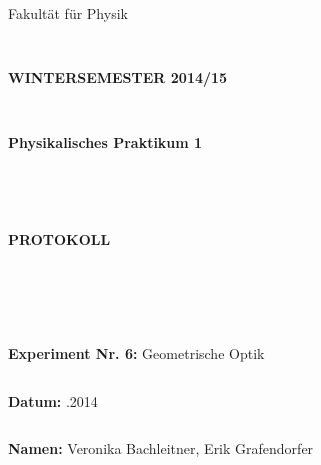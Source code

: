 \documentclass{article}
\begin{document}
\thispagestyle{empty}
			\begin{center}
			\Large{Fakultät für Physik}\\
			\end{center}
\begin{verbatim}


\end{verbatim}
			\begin{center}
			\textbf{\LARGE WINTERSEMESTER 2014/15}
			\end{center}
\begin{verbatim}


\end{verbatim}
			\begin{center}
			\textbf{\LARGE{Physikalisches Praktikum 1}}
			\end{center}
\begin{verbatim}




\end{verbatim}

			\begin{center}
			\textbf{\LARGE{PROTOKOLL}}
			\end{center}
			
\begin{verbatim}





\end{verbatim}

			\begin{flushleft}
			\Large{\textbf{Experiment Nr. 6:} Geometrische Optik}\\
			\LARGE{}	
			\end{flushleft}

\begin{verbatim}

\end{verbatim}	
			\begin{flushleft}
			\textbf{\Large{Datum:}} \Large{.2014}
			\end{flushleft}
			
\begin{verbatim}
\end{verbatim}
		\begin{flushleft}
			\textbf{\Large{Namen:}} \Large{Veronika Bachleitner, Erik Grafendorfer}
			\end{flushleft}
\end{document}
